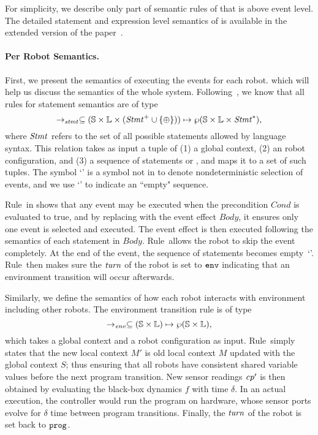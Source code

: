 For simplicity, we describe only part of semantic rules of \lgname that is above event level.
The detailed statement and expression level semantics of \lgname is available in the extended version of the paper~\cite{}.

\paragraph{Per Robot Semantics.}
First, we present the semantics of executing the events for each robot.
which will help us discuss the semantics of the whole system.
Following~\cite{}, we know that all rules for statement semantics are of type
\[
\rightarrow_\mathit{stmt} \subseteq (\mathbb{S} \times \mathbb{L}\times (\mathit{Stmt}^+ \cup \{\mathtt{\oplus}\})) \mapsto \wp(\mathbb{S}\times \mathbb{L} \times \mathit{Stmt}^*),
\]
where $\mathit{Stmt}$ refers to the set of all possible statements allowed by language syntax.
This relation takes as input a tuple of (1) a global context, (2) an robot configuration, and (3) a sequence of statements or \SelectEvent,
and maps it to a set of such tuples.
The symbol `\SelectEvent' is a symbol not in \lgname to denote nondeterministic selection of events,
and we use `\EndEvent' to indicate an ``empty" sequence.

Rule~\SelectEventRule in  shows that any event may be executed when the precondition $Cond$ is evaluated to true,
and by replacing \SelectEvent with the event effect $\mathit{Body}$, it ensures only one event is selected and executed.
The event effect is then executed following the semantics of each statement in $\mathit{Body}$.
Rule~\SkipEventRule allows the robot to skip the event completely.
At the end of the event, the sequence of statements becomes empty~`\EndEvent'.
Rule~\EndEventRule then makes sure the $\mathit{turn}$ of the robot is set to $\mathtt{env}$ indicating that
an environment transition will occur afterwards.

Similarly, we define the semantics of how each robot interacts with environment including other robots.
The environment transition rule is of type
\[
\rightarrow_\mathit{env} \subseteq (\mathbb{S} \times \mathbb{L}) \mapsto \wp(\mathbb{S}\times \mathbb{L}),
\]
which takes a global context and a robot configuration as input.
Rule~\RobotEnvRule simply states that the new local context $M'$ is
old local context $M$ updated with the global context $S$;
thus ensuring that all robots have consistent shared variable values before the next program transition.
New sensor readings $\mathit{cp}'$ is then obtained by evaluating the black-box dynamics $f$ with time $\delta$.
In an actual execution, the controller would run the program on hardware,
whose sensor ports evolve for $\delta$ time between program transitions.
%
Finally, the $\mathit{turn}$ of the robot is set back to $\mathtt{prog}$.


